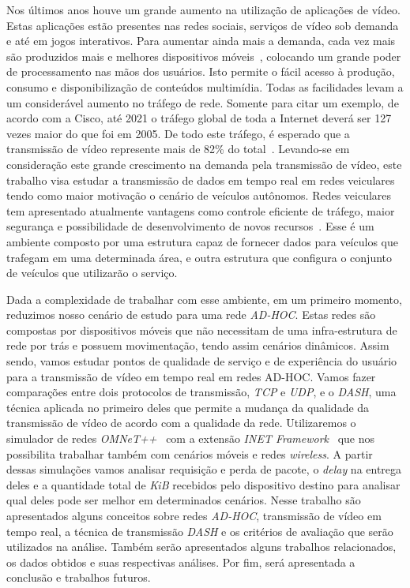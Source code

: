 \documentclass[12pt]{article}
\begin{document}
    Nos últimos anos houve um grande aumento na utilização de aplicações de vídeo. Estas aplicações estão presentes nas redes sociais, serviços de vídeo sob demanda e até em jogos interativos. Para aumentar ainda mais a demanda, cada vez mais são produzidos mais e melhores dispositivos móveis~\cite{Adobe2017}, colocando um grande poder de processamento nas mãos dos usuários. Isto permite o fácil acesso à produção, consumo e disponibilização de conteúdos multimídia. Todas as facilidades levam a um considerável aumento no tráfego de rede. Somente para citar um exemplo, de acordo com a Cisco, até 2021 o tráfego global de toda a Internet deverá ser 127 vezes maior do que foi em 2005. De todo este tráfego, é esperado que a transmissão de vídeo represente mais de 82\% do total~\cite{Cisco2017}. Levando-se em consideração este grande crescimento na demanda pela transmissão de vídeo, este trabalho visa estudar a transmissão de dados em tempo real em redes veiculares tendo como maior motivação o cenário de veículos autônomos. Redes veiculares tem apresentado atualmente vantagens como controle eficiente de tráfego, maior segurança e possibilidade de desenvolvimento de novos recursos~\cite{Yi:2015:SFC:2757384.2757397}. Esse é um ambiente composto por uma estrutura capaz de fornecer dados para veículos que trafegam em uma determinada área, e outra estrutura que configura o conjunto de veículos que utilizarão o serviço.
    
	Dada a complexidade de trabalhar com esse ambiente, em um primeiro momento, reduzimos nosso cenário de estudo para uma rede \textit{AD-HOC}. Estas redes são compostas por dispositivos móveis que não necessitam de uma infra-estrutura de rede por trás e possuem movimentação, tendo assim cenários dinâmicos. Assim sendo, vamos estudar pontos de qualidade de serviço e de experiência do usuário para a transmissão de vídeo em tempo real em redes AD-HOC. Vamos fazer comparações entre dois protocolos de transmissão, \textit{TCP} e \textit{UDP}, e o \textit{DASH}, uma técnica aplicada no primeiro deles que permite a mudança da qualidade da transmissão de vídeo de acordo com a qualidade da rede. Utilizaremos o simulador de redes \textit{OMNeT++}~\cite{omnet} com a extensão\textit{ INET Framework}~\cite{inet} que nos possibilita trabalhar também com cenários móveis e redes \textit{wireless}. A partir dessas simulações vamos analisar requisição e perda de pacote, o \textit{delay} na entrega deles e a quantidade total de \textit{KiB} recebidos pelo dispositivo destino para analisar qual deles pode ser melhor em determinados cenários.
    Nesse trabalho são apresentados alguns conceitos sobre redes \textit{AD-HOC}, transmissão de vídeo em tempo real, a técnica de transmissão \textit{DASH} e os critérios de avaliação que serão utilizados na análise. Também serão apresentados alguns trabalhos relacionados, os dados obtidos e suas respectivas análises. Por fim, será apresentada a conclusão e trabalhos futuros.
    
\end{document}

